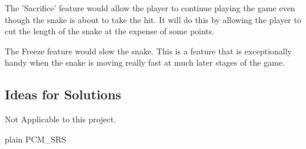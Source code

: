 \documentclass[12pt]{article}
\newcounter{goalnum} %
\begin{document}
	The 'Sacrifice' feature would allow the player to continue playing the game even though the snake is about to take the hit. It will do this by allowing the player to cut the length of the snake at the expense of some points.

	The Freeze feature would slow the snake. This is a feature that is exceptionally handy when the snake is moving really fast at much later stages of the game.
\subsection{Ideas for Solutions}
	Not Applicable to this project.





 {plain}
 {PCM_SRS}
\end{document}
